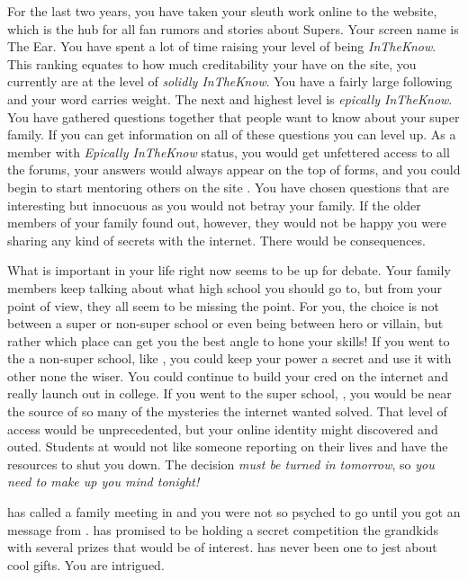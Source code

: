 \documentclass[char]{LRSguildcamp1}
\begin{document}
For the last two years, you have taken your sleuth work online to the \pTweenwebsite{} website, which is the hub for all fan rumors and stories about Supers. Your screen name is The Ear. You have spent a lot of time raising your level of being \textsl{InTheKnow}. This ranking equates to how much creditability your have on the site, you currently are at the level of \textsl{solidly InTheKnow}. You have a fairly large following and your word carries weight. The next and highest level is \textsl{epically InTheKnow}. You have gathered questions together that people want to know about your super family. If you can get information on all of these questions you can level up. As a member with \textit{Epically InTheKnow} status, you would get unfettered access to all the forums, your answers would always appear on the top of forms, and you could begin to start mentoring others on the site \pTweenwebsite{}. You have chosen questions that are interesting but innocuous as you would not betray your family. If the older members of your family found out, however, they would not be happy you were sharing any kind of secrets with the internet. There would be consequences. 

What is important in your life right now seems to be up for debate. Your family members keep talking about what high school you should go to, but from your point of view, they all seem to be missing the point. For you, the choice is not between a super or non-super school or even being  between hero or villain, but rather which place can get you the best angle to hone your skills! If you went to the a non-super school, like \pNormalSchool{}, you could keep your power a secret and use it with other none the wiser. You could continue to build your cred on the internet and really launch out in college. If you went to the super school, \pSuperSchool{}, you would be near the source of so many of the mysteries the internet wanted solved. That level of access would be unprecedented, but your online identity might discovered and outed. Students at \pSuperSchool{} would not like someone reporting on their lives and have the resources to shut you down. 
The decision \textsl{must be turned in tomorrow}, so \textit{you need to make up you mind tonight!}

\cGrandma{} has called a family meeting in \pCityGrandma{} and you were not so psyched to go until you got an message from \cGrandma{}. \cGrandma{\they} has promised to be holding a secret competition the grandkids with several prizes that would be of interest. \cGrandma{} has never been one to jest about cool gifts. You are intrigued.  
\end{document}
